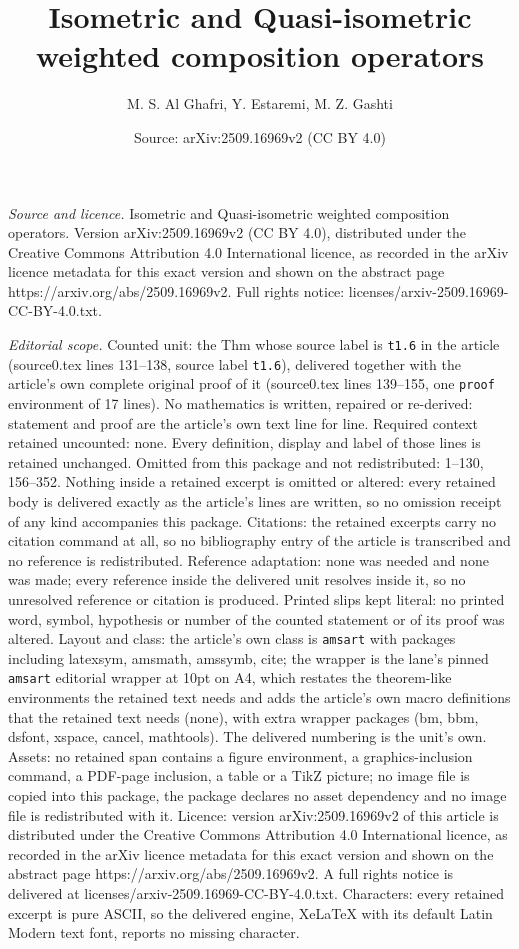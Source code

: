 \documentclass[10pt,a4paper]{amsart}
\title[Isometric and Quasi-isometric weighted composition operators]{Isometric and Quasi-isometric weighted composition operators}
\author{M. S. Al Ghafri, Y. Estaremi, M. Z. Gashti}
\date{Source: arXiv:2509.16969v2 (CC BY 4.0)}
\begin{document}
\maketitle

\noindent\emph{Source and licence.} Isometric and Quasi-isometric weighted composition operators. Version arXiv:2509.16969v2 (CC BY 4.0), distributed under the Creative Commons Attribution 4.0 International licence, as recorded in the arXiv licence metadata for this exact version and shown on the abstract page https://arxiv.org/abs/2509.16969v2. Full rights notice: licenses/arxiv-2509.16969-CC-BY-4.0.txt.\par\smallskip

\noindent\textit{Editorial scope.} Counted unit: the Thm whose source label is \texttt{t1.6} in the article (source0.tex lines 131--138, source label \texttt{t1.6}), delivered together with the article's own complete original proof of it (source0.tex lines 139--155, one \texttt{proof} environment of 17 lines). No mathematics is written, repaired or re-derived: statement and proof are the article's own text line for line. Required context retained uncounted: none. Every definition, display and label of those lines is retained unchanged. Omitted from this package and not redistributed: 1--130, 156--352. Nothing inside a retained excerpt is omitted or altered: every retained body is delivered exactly as the article's lines are written, so no omission receipt of any kind accompanies this package. Citations: the retained excerpts carry no citation command at all, so no bibliography entry of the article is transcribed and no reference is redistributed. Reference adaptation: none was needed and none was made; every reference inside the delivered unit resolves inside it, so no unresolved reference or citation is produced. Printed slips kept literal: no printed word, symbol, hypothesis or number of the counted statement or of its proof was altered. Layout and class: the article's own class is \texttt{amsart} with packages including latexsym, amsmath, amssymb, cite; the wrapper is the lane's pinned \texttt{amsart} editorial wrapper at 10pt on A4, which restates the theorem-like environments the retained text needs and adds the article's own macro definitions that the retained text needs (none), with extra wrapper packages (bm, bbm, dsfont, xspace, cancel, mathtools). The delivered numbering is the unit's own. Assets: no retained span contains a figure environment, a graphics-inclusion command, a PDF-page inclusion, a table or a TikZ picture; no image file is copied into this package, the package declares no asset dependency and no image file is redistributed with it. Licence: version arXiv:2509.16969v2 of this article is distributed under the Creative Commons Attribution 4.0 International licence, as recorded in the arXiv licence metadata for this exact version and shown on the abstract page https://arxiv.org/abs/2509.16969v2. A full rights notice is delivered at licenses/arxiv-2509.16969-CC-BY-4.0.txt. Characters: every retained excerpt is pure ASCII, so the delivered engine, XeLaTeX with its default Latin Modern text font, reports no missing character.
\end{document}
